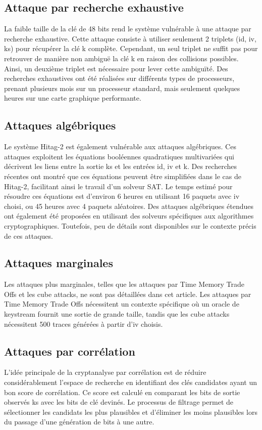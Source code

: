 \documentclass{template}
\begin{document}
\subsection{Attaque par recherche exhaustive}
\baselineskip=16pt
La faible taille de la clé de 48 bits rend le système vulnérable à une attaque par recherche exhaustive. Cette attaque consiste à utiliser seulement 2 triplets (id, iv, ks) pour récupérer la clé k complète. Cependant, un seul triplet ne suffit pas pour retrouver de manière non ambiguë la clé k en raison des collisions possibles. Ainsi, un deuxième triplet est nécessaire pour lever cette ambiguïté. Des recherches exhaustives ont été réalisées sur différents types de processeurs, prenant plusieurs mois sur un processeur standard, mais seulement quelques heures sur une carte graphique performante.

\subsection{Attaques algébriques}
\baselineskip=16pt
Le système Hitag-2 est également vulnérable aux attaques algébriques. Ces attaques exploitent les équations booléennes quadratiques multivariées qui décrivent les liens entre la sortie ks et les entrées id, iv et k. Des recherches récentes ont montré que ces équations peuvent être simplifiées dans le cas de Hitag-2, facilitant ainsi le travail d'un solveur SAT. Le temps estimé pour résoudre ces équations est d'environ 6 heures en utilisant 16 paquets avec iv choisi, ou 45 heures avec 4 paquets aléatoires. Des attaques algébriques étendues ont également été proposées en utilisant des solveurs spécifiques aux algorithmes cryptographiques. Toutefois, peu de détails sont disponibles sur le contexte précis de ces attaques.

\subsection{Attaques marginales}

Les attaques plus marginales, telles que les attaques par Time Memory Trade Offs et les cube attacks, ne sont pas détaillées dans cet article. Les attaques par Time Memory Trade Offs nécessitent un contexte spécifique où un oracle de keystream fournit une sortie de grande taille, tandis que les cube attacks nécessitent 500 traces générées à partir d'iv choisis.

\subsection{Attaques par corrélation}
\baselineskip=16pt
L'idée principale de la cryptanalyse par corrélation est de réduire considérablement l'espace de recherche en identifiant des clés candidates ayant un bon score de corrélation. Ce score est calculé en comparant les bits de sortie observés ks avec les bits de clé devinés. Le processus de filtrage permet de sélectionner les candidats les plus plausibles et d'éliminer les moins plausibles lors du passage d'une génération de bits à une autre.
\end{document}
